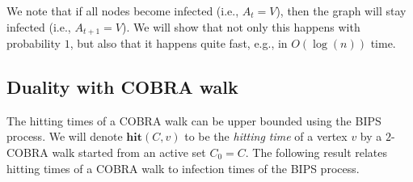 \documentclass[11pt]{article}
\newcommand{\hit}{\mathbf{hit}}
\theoremstyle{remark}
\begin{document}
We note that if all nodes become infected (i.e., $A_t = V$), then the graph will stay infected (i.e., $A_{t+1} = V$). We will show that not only this happens with probability $1$, but also that it happens quite fast, e.g., in $O(\log(n))$ time.

\subsection{Duality with COBRA walk}

The hitting times of a COBRA walk can be upper bounded using the BIPS process. We will denote $\hit(C,v)$ to be the \emph{hitting time} of a vertex $v$ by a $2$-COBRA walk started from an active set $C_0 = C$. The following result relates hitting times of a COBRA walk to infection times of the BIPS process.
\end{document}
